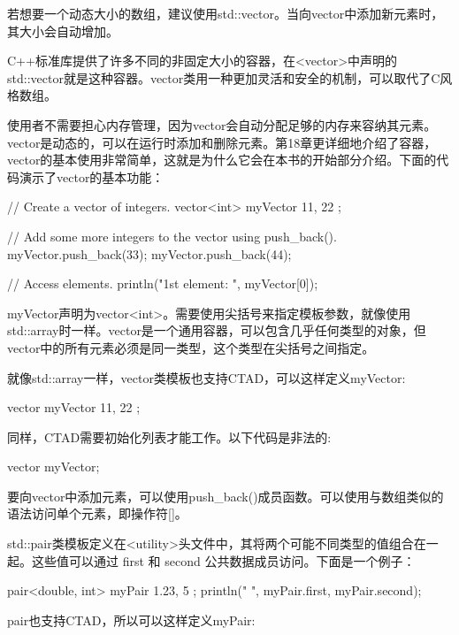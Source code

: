 若想要一个动态大小的数组，建议使用std::vector。当向vector中添加新元素时，其大小会自动增加。


C++标准库提供了许多不同的非固定大小的容器，在<vector>中声明的std::vector就是这种容器。vector类用一种更加灵活和安全的机制，可以取代了C风格数组。

使用者不需要担心内存管理，因为vector会自动分配足够的内存来容纳其元素。vector是动态的，可以在运行时添加和删除元素。第18章更详细地介绍了容器，vector的基本使用非常简单，这就是为什么它会在本书的开始部分介绍。下面的代码演示了vector的基本功能：


\begin{cpp}
// Create a vector of integers.
vector<int> myVector { 11, 22 };

// Add some more integers to the vector using push_back().
myVector.push_back(33);
myVector.push_back(44);

// Access elements.
println("1st element: {}", myVector[0]);
\end{cpp}

myVector声明为vector<int>。需要使用尖括号来指定模板参数，就像使用std::array时一样。vector是一个通用容器，可以包含几乎任何类型的对象，但vector中的所有元素必须是同一类型，这个类型在尖括号之间指定。

就像std::array一样，vector类模板也支持CTAD，可以这样定义myVector:

\begin{cpp}
vector myVector { 11, 22 };
\end{cpp}

同样，CTAD需要初始化列表才能工作。以下代码是非法的:

\begin{cpp}
vector myVector;
\end{cpp}

要向vector中添加元素，可以使用push\_back()成员函数。可以使用与数组类似的语法访问单个元素，即操作符[]。


std::pair类模板定义在<utility>头文件中，其将两个可能不同类型的值组合在一起。这些值可以通过 first 和 second 公共数据成员访问。下面是一个例子：

\begin{cpp}
pair<double, int> myPair { 1.23, 5 };
println("{} {}", myPair.first, myPair.second);
\end{cpp}

pair也支持CTAD，所以可以这样定义myPair:


